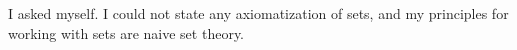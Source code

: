 \subsection{}

I asked myself.
I could not state any axiomatization of sets, and my principles for working with sets are naive set theory.
